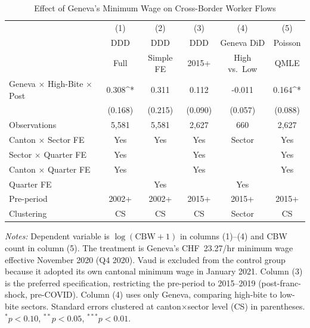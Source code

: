 \begin{table}[htbp]
\centering
\caption{Effect of Geneva's Minimum Wage on Cross-Border Worker Flows}
\label{tab:main}
\begin{tabular}{lccccc}
\toprule
 & (1) & (2) & (3) & (4) & (5) \\
 & DDD & DDD & DDD & Geneva DiD & Poisson \\
 & Full & Simple FE & 2015+ & High vs.~Low & QMLE \\
\midrule
 Geneva $\times$ High-Bite $\times$ Post & 0.308^{*} & 0.311 & 0.112 & -0.011 & 0.164^{*} \\
 & (0.168) & (0.215) & (0.090) & (0.057) & (0.088) \\
\midrule
Observations & 5,581 & 5,581 & 2,627 & 660 & 2,627 \\
Canton $\times$ Sector FE & Yes & Yes & Yes & Sector & Yes \\
Sector $\times$ Quarter FE & Yes & & Yes & & Yes \\
Canton $\times$ Quarter FE & Yes & & Yes & & Yes \\
Quarter FE & & Yes & & Yes & \\
Pre-period & 2002+ & 2002+ & 2015+ & 2015+ & 2015+ \\
Clustering & CS & CS & CS & Sector & CS \\
\bottomrule
\end{tabular}
\begin{tablenotes}
\small
\item \textit{Notes:} Dependent variable is $\log(\text{CBW} + 1)$ in columns (1)--(4) and CBW count in column (5). The treatment is Geneva's CHF~23.27/hr minimum wage effective November 2020 (Q4 2020). Vaud is excluded from the control group because it adopted its own cantonal minimum wage in January 2021. Column (3) is the preferred specification, restricting the pre-period to 2015--2019 (post-franc-shock, pre-COVID). Column (4) uses only Geneva, comparing high-bite to low-bite sectors. Standard errors clustered at canton$\times$sector level (CS) in parentheses. $^{*}p<0.10$, $^{**}p<0.05$, $^{***}p<0.01$.
\end{tablenotes}
\end{table}
